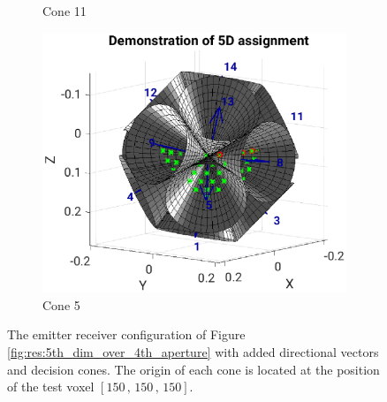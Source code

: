 \begin{figure}[H]
\begin{subfigure}[b]{0.49\textwidth}
         \caption{Cone 11}
         \label{fig:res:5th_4th_cones11}
     \end{subfigure}
     \hfill
     \begin{subfigure}[b]{0.49\textwidth}
         \centering
         \includegraphics[width=1.3\textwidth]{Graphics/Results/4d_5d/5thDim_over_4thDim_150_150_150_cones_9_8_center.eps}
         \caption{Cone 5}
         \label{fig:res:5th_4th_cones5}
     \end{subfigure}
        \caption{The emitter receiver configuration of Figure \ref{fig:res:5th_dim_over_4th_aperture} with added directional vectors and decision cones. The origin of each cone is located at the position of the test voxel $[150\, , \, 150\, , \, 150]$. }
        \label{fig:res:5th_4th_cones}
\end{figure}

